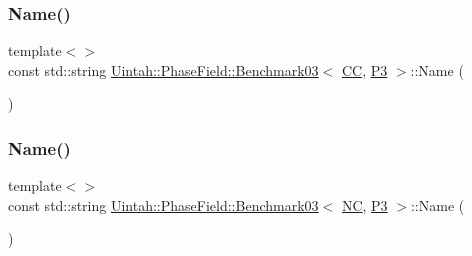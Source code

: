 \subsubsection{\texorpdfstring{Name()}{Name()}\hspace{0.1cm}{\footnotesize\ttfamily [1/2]}}
{\footnotesize\ttfamily template$<$$>$ \\
const std\+::string \hyperlink{classUintah_1_1PhaseField_1_1Benchmark03}{Uintah\+::\+Phase\+Field\+::\+Benchmark03}$<$ \hyperlink{namespaceUintah_1_1PhaseField_a33d355affda78a83f45755ba8388cedda22303704507d024d1d6508ed9859a85a}{CC}, \hyperlink{namespaceUintah_1_1PhaseField_a24d833a720598df1020f5cc2e75f8702a4f237510ae9624ab7568055802b586c6}{P3} $>$\+::Name (\begin{DoxyParamCaption}{ }\end{DoxyParamCaption})}

\mbox{\label{classUintah_1_1PhaseField_1_1Benchmark03_a5a0cc49838d8e6850bf47551196041c4}} 
\subsubsection{\texorpdfstring{Name()}{Name()}\hspace{0.1cm}{\footnotesize\ttfamily [2/2]}}
{\footnotesize\ttfamily template$<$$>$ \\
const std\+::string \hyperlink{classUintah_1_1PhaseField_1_1Benchmark03}{Uintah\+::\+Phase\+Field\+::\+Benchmark03}$<$ \hyperlink{namespaceUintah_1_1PhaseField_a33d355affda78a83f45755ba8388cedda77924170fe82bfd58b74ca3e44139718}{NC}, \hyperlink{namespaceUintah_1_1PhaseField_a24d833a720598df1020f5cc2e75f8702a4f237510ae9624ab7568055802b586c6}{P3} $>$\+::Name (\begin{DoxyParamCaption}{ }\end{DoxyParamCaption})}

\mbox{\label{classUintah_1_1PhaseField_1_1Benchmark03_a737e2ac7671a49af4ea12c684d5c8e63}} 
